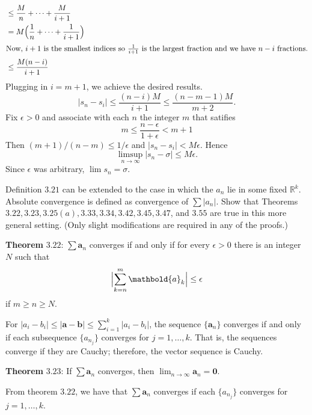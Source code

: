 \begin{exercise}
\begin{exercise}[label = (\alph*), ref = \arabic{exercisei} (\alph*)]
{\begin{align*}
        & \leq \frac{M}{n} + \cdots + \frac{M}{i + 1}\\
        & = M\Bigl(\frac{1}{n} + \cdots + \frac{1}{i + 1}\Bigr)\\
        \intertext{Now, \(i + 1\) is the smallest indices so
        \(\frac{1}{i + 1}\) is the largest fraction and we have \(n - i\)
        fractions.}
        & \leq \frac{M(n - i)}{i + 1}
      \end{align*}
      Plugging in \(i = m + 1\), we achieve the desired results.
    }
    \[
    \lvert s_n - s_i\rvert\leq\frac{(n - i)M}{i + 1}\leq
    \frac{(n - m - 1)M}{m + 2}.
    \]
    Fix \(\epsilon > 0\) and associate with each \(n\) the integer \(m\) that
    satifies
    \[
    m\leq\frac{n - \epsilon}{1 + \epsilon} < m + 1
    \]
    Then \((m + 1)/(n - m)\leq 1/\epsilon\) and
    \(\lvert s_n - s_i\rvert < M\epsilon\).
    Hence
    \[
    \limsup_{n\to\infty}\lvert s_n - \sigma\rvert\leq M\epsilon.
    \]
    Since \(\epsilon\) was arbitrary, \(\lim s_n = \sigma\).
  \end{exercise}
\item
  Definition \(3.21\) can be extended to the case in which the \(a_n\) lie in
  some fixed \(\mathbb{R}^k\).
  Absolute convergence is defined as convergence of \(\sum\lvert a_n\rvert\).
  Show that Theorems \(3.22,3.23,3.25(a),3.33,3.34,3.42,3.45,3.47\), and
  \(3.55\) are true in this more general setting.
  (Only slight modifications are required in any of the proofs.)
  \par\smallskip
  \textbf{Theorem} \(\mathbold{3.22}\): \(\sum\mathbold{a}_n\) converges if
  and only if for every \(\epsilon > 0\) there is an integer \(N\) such that
  \[
  \Bigl\lvert\sum_{k = n}^m\mathbold{a}_k\Bigr\rvert\leq\epsilon
  \]
  if \(m\geq n\geq N\).
  \par\smallskip
  For \(\lvert a_i - b_i\rvert\leq\lvert\mathbold{a} - \mathbold{b}\rvert\leq
  \sum_{i = 1}^k\lvert a_i - b_i\rvert\), the sequence \(\{\mathbold{a}_n\}\)
  converges if and only if each subsequence \(\{a_{n_j}\}\) converges for
  \(j = 1,\ldots,k\).
  That is, the sequences converge if they are Cauchy; therefore, the vector
  sequence is Cauchy.
  \par\smallskip
  \textbf{Theorem} \(\mathbold{3.23}\): If \(\sum\mathbold{a}_n\) converges,
  then \(\lim_{n\to\infty}\mathbold{a}_n = \mathbold{0}\).
  \par\smallskip
  From theorem \(3.22\), we have that \(\sum\mathbold{a}_n\) converges if each
  \(\{a_{n_j}\}\) converges for \(j = 1,\ldots,k\).

\end{exercise}

